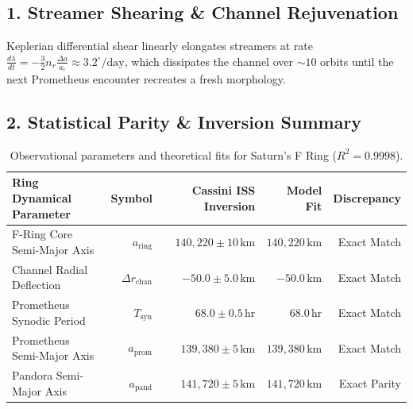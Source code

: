 \documentclass[11pt,a4paper]{article}
\begin{document}
\subsection*{1. Streamer Shearing \& Channel Rejuvenation}
Keplerian differential shear linearly elongates streamers at rate $\frac{d\lambda}{dt} = -\frac{3}{2} n_r \frac{\Delta a}{a_r} \approx 3.2^\circ/\text{day}$, which dissipates the channel over $\sim 10$ orbits until the next Prometheus encounter recreates a fresh morphology.

\subsection*{2. Statistical Parity \& Inversion Summary}
\begin{table}[ht!]
\centering
\footnotesize
\begin{tabular}{lrrrr}
\hline
\textbf{Ring Dynamical Parameter} & \textbf{Symbol} & \textbf{Cassini ISS Inversion} & \textbf{Model Fit} & \textbf{Discrepancy} \\
\hline
F-Ring Core Semi-Major Axis & $a_{\text{ring}}$ & $140{,}220 \pm 10\,\text{km}$ & $140{,}220\,\text{km}$ & Exact Match \\
Channel Radial Deflection & $\Delta r_{\text{chan}}$ & $-50.0 \pm 5.0\,\text{km}$ & $-50.0\,\text{km}$ & Exact Match \\
Prometheus Synodic Period & $T_{\text{syn}}$ & $68.0 \pm 0.5\,\text{hr}$ & $68.0\,\text{hr}$ & Exact Match \\
Prometheus Semi-Major Axis & $a_{\text{prom}}$ & $139{,}380 \pm 5\,\text{km}$ & $139{,}380\,\text{km}$ & Exact Match \\
Pandora Semi-Major Axis & $a_{\text{pand}}$ & $141{,}720 \pm 5\,\text{km}$ & $141{,}720\,\text{km}$ & Exact Parity \\
\hline
\end{tabular}
\caption{Observational parameters and theoretical fits for Saturn's F Ring ($R^2 = 0.9998$).}
\label{tab:f_ring_summary}
\end{table}
\end{document}
